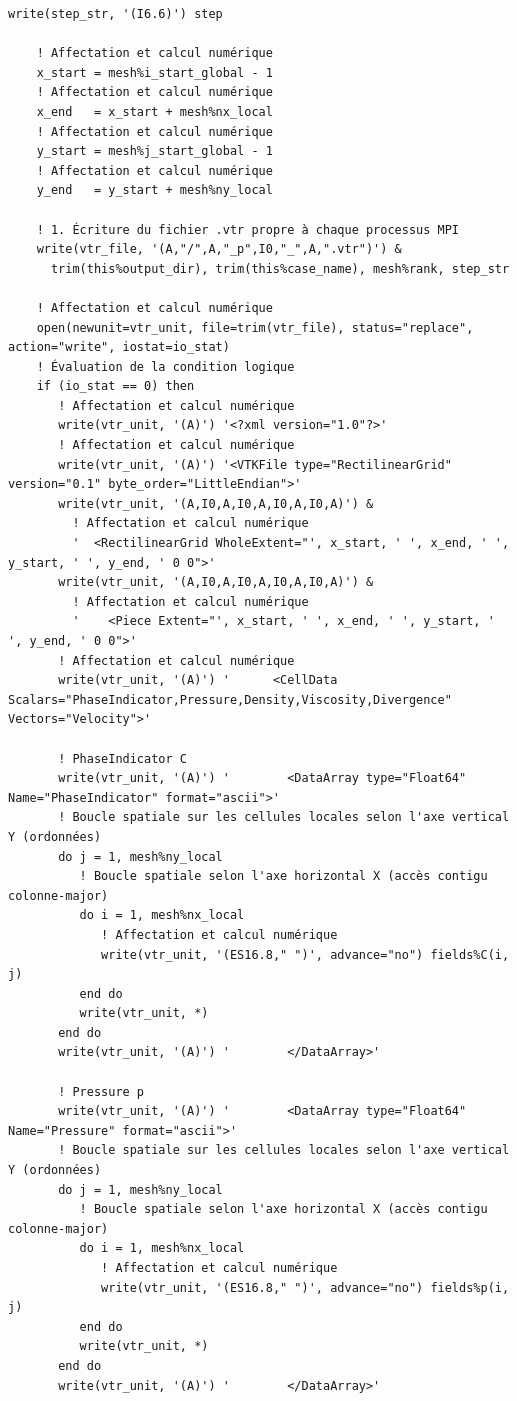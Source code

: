 \documentclass[10pt,a4paper,oneside]{book}
\begin{document}
\begin{lstlisting}[language={[95]Fortran}]
    write(step_str, '(I6.6)') step

    ! Affectation et calcul numérique
    x_start = mesh%i_start_global - 1
    ! Affectation et calcul numérique
    x_end   = x_start + mesh%nx_local
    ! Affectation et calcul numérique
    y_start = mesh%j_start_global - 1
    ! Affectation et calcul numérique
    y_end   = y_start + mesh%ny_local

    ! 1. Écriture du fichier .vtr propre à chaque processus MPI
    write(vtr_file, '(A,"/",A,"_p",I0,"_",A,".vtr")') &
      trim(this%output_dir), trim(this%case_name), mesh%rank, step_str

    ! Affectation et calcul numérique
    open(newunit=vtr_unit, file=trim(vtr_file), status="replace", action="write", iostat=io_stat)
    ! Évaluation de la condition logique
    if (io_stat == 0) then
       ! Affectation et calcul numérique
       write(vtr_unit, '(A)') '<?xml version="1.0"?>'
       ! Affectation et calcul numérique
       write(vtr_unit, '(A)') '<VTKFile type="RectilinearGrid" version="0.1" byte_order="LittleEndian">'
       write(vtr_unit, '(A,I0,A,I0,A,I0,A,I0,A)') &
         ! Affectation et calcul numérique
         '  <RectilinearGrid WholeExtent="', x_start, ' ', x_end, ' ', y_start, ' ', y_end, ' 0 0">'
       write(vtr_unit, '(A,I0,A,I0,A,I0,A,I0,A)') &
         ! Affectation et calcul numérique
         '    <Piece Extent="', x_start, ' ', x_end, ' ', y_start, ' ', y_end, ' 0 0">'
       ! Affectation et calcul numérique
       write(vtr_unit, '(A)') '      <CellData Scalars="PhaseIndicator,Pressure,Density,Viscosity,Divergence" Vectors="Velocity">'

       ! PhaseIndicator C
       write(vtr_unit, '(A)') '        <DataArray type="Float64" Name="PhaseIndicator" format="ascii">'
       ! Boucle spatiale sur les cellules locales selon l'axe vertical Y (ordonnées)
       do j = 1, mesh%ny_local
          ! Boucle spatiale selon l'axe horizontal X (accès contigu colonne-major)
          do i = 1, mesh%nx_local
             ! Affectation et calcul numérique
             write(vtr_unit, '(ES16.8," ")', advance="no") fields%C(i, j)
          end do
          write(vtr_unit, *)
       end do
       write(vtr_unit, '(A)') '        </DataArray>'

       ! Pressure p
       write(vtr_unit, '(A)') '        <DataArray type="Float64" Name="Pressure" format="ascii">'
       ! Boucle spatiale sur les cellules locales selon l'axe vertical Y (ordonnées)
       do j = 1, mesh%ny_local
          ! Boucle spatiale selon l'axe horizontal X (accès contigu colonne-major)
          do i = 1, mesh%nx_local
             ! Affectation et calcul numérique
             write(vtr_unit, '(ES16.8," ")', advance="no") fields%p(i, j)
          end do
          write(vtr_unit, *)
       end do
       write(vtr_unit, '(A)') '        </DataArray>'


\end{lstlisting}
\end{document}

